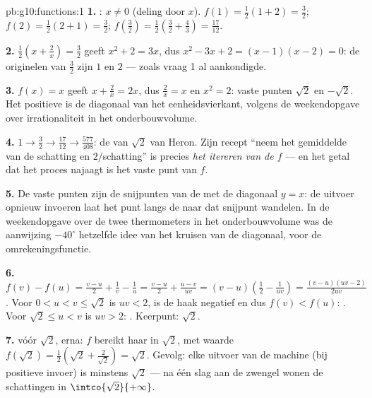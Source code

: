 \begin{solution}{pb:g10:functions:1}
\textbf{1.} : $x \neq 0$ (deling door $x$). $f(1) = \frac12(1 + 2) =
\frac32$; $f(2) = \frac12(2 + 1) = \frac32$;
$f\!\left(\frac32\right) = \frac12\left(\frac32 + \frac43\right) =
\frac{17}{12}$.

\textbf{2.} $\frac12\left(x + \frac2x\right) = \frac32$ geeft
$x^2 + 2 = 3x$, dus $x^2 - 3x + 2 = (x - 1)(x - 2) = 0$: de originelen van
$\frac32$ zijn $1$ en $2$ --- zoals vraag 1 al aankondigde.

\textbf{3.} $f(x) = x$ geeft $x + \frac2x = 2x$, dus $\frac2x = x$ en
$x^2 = 2$: vaste punten $\sqrt2$ en $-\sqrt2$. Het positieve is de diagonaal
van het eenheidsvierkant,  volgens de weekendopgave over
irrationaliteit in het onderbouwvolume.

\textbf{4.} $1 \to \frac32 \to \frac{17}{12} \to \frac{577}{408}$: de
 van $\sqrt2$ van Heron. Zijn recept ``neem het gemiddelde van
de schatting en $2/$schatting'' is precies \emph{het itereren van de 
$f$} --- en het getal dat het proces najaagt is het vaste punt van $f$.

\textbf{5.} De vaste punten zijn de snijpunten van de  met de
diagonaal $y = x$: de uitvoer opnieuw invoeren laat het punt langs de
 naar dat snijpunt wandelen. In de weekendopgave over de twee
thermometers in het onderbouwvolume was de aanwijzing $-40^\circ$ hetzelfde
idee van het kruisen van de diagonaal, voor de omrekeningsfunctie.

\textbf{6.} $f(v) - f(u) = \frac{v - u}{2} + \frac1v - \frac1u =
\frac{v - u}{2} + \frac{u - v}{uv}
= (v - u)\left(\frac12 - \frac{1}{uv}\right)
= \frac{(v - u)(uv - 2)}{2uv}$. Voor $0 < u < v \leq \sqrt2$ is $uv < 2$, is
de haak negatief en dus $f(v) < f(u)$: . Voor $\sqrt2 \leq u < v$ is
$uv > 2$: . Keerpunt: $\sqrt2$.

\textbf{7.}  vóór $\sqrt2$,  erna: $f$ bereikt haar  in
$\sqrt2$, met waarde
$f(\sqrt2) = \frac12\left(\sqrt2 + \frac{2}{\sqrt2}\right) = \sqrt2$.
Gevolg: elke uitvoer van de machine (bij positieve invoer) is minstens
$\sqrt2$ --- na één slag aan de zwengel wonen de schattingen in
$\intco{\sqrt2}{+\infty}$.


\end{solution}
